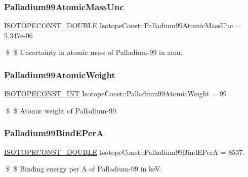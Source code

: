\subsubsection{\texorpdfstring{Palladium99\+Atomic\+Mass\+Unc}{Palladium99AtomicMassUnc}}
{\footnotesize\ttfamily \mbox{\hyperlink{group___isotope_const-_macros_ga8f45a7272ce02c0b4c65c44636ed719a}{I\+S\+O\+T\+O\+P\+E\+C\+O\+N\+S\+T\+\_\+\+D\+O\+U\+B\+LE}} Isotope\+Const\+::\+Palladium99\+Atomic\+Mass\+Unc = 5.\+347e-\/06}

\$ \$ Uncertainty in atomic mass of Palladium-\/99 in amu. \mbox{\label{group___isotope_const-_palladium-_pd99_ga2cf2542bc89470ec3de3e2aa8e9082de}} 
\subsubsection{\texorpdfstring{Palladium99\+Atomic\+Weight}{Palladium99AtomicWeight}}
{\footnotesize\ttfamily \mbox{\hyperlink{group___isotope_const-_macros_ga5f18360b3e99483a35c32d789e62621c}{I\+S\+O\+T\+O\+P\+E\+C\+O\+N\+S\+T\+\_\+\+I\+NT}} Isotope\+Const\+::\+Palladium99\+Atomic\+Weight = 99}

\$ \$ Atomic weight of Palladium-\/99. \mbox{\label{group___isotope_const-_palladium-_pd99_ga208e20ab12de26220f0c8dfcbb2e2a27}} 
\subsubsection{\texorpdfstring{Palladium99\+Bind\+E\+PerA}{Palladium99BindEPerA}}
{\footnotesize\ttfamily \mbox{\hyperlink{group___isotope_const-_macros_ga8f45a7272ce02c0b4c65c44636ed719a}{I\+S\+O\+T\+O\+P\+E\+C\+O\+N\+S\+T\+\_\+\+D\+O\+U\+B\+LE}} Isotope\+Const\+::\+Palladium99\+Bind\+E\+PerA = 8537.}

\$ \$ Binding energy per A of Palladium-\/99 in keV. \mbox{\label{group___isotope_const-_palladium-_pd99_ga7d9a3ae61651bffdb8ea0464d2d9c964}} 
